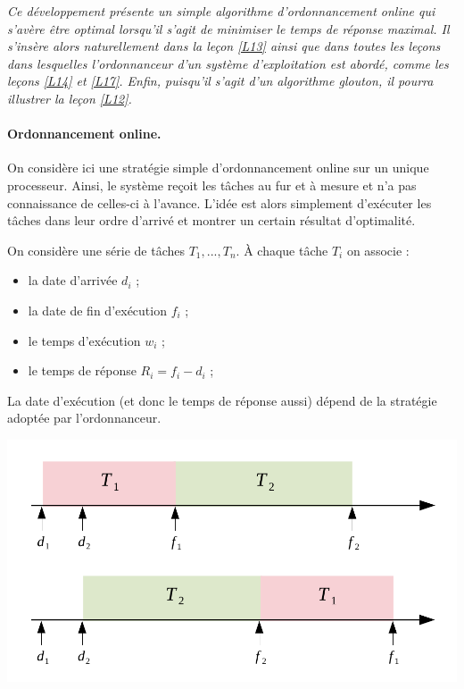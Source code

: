
\textit{Ce développement présente un simple algorithme d'ordonnancement online qui s'avère être optimal lorsqu'il s'agit de minimiser le temps de réponse maximal. Il s'insère alors naturellement dans la leçon \ref{L13} ainsi que dans toutes les leçons dans lesquelles l'ordonnanceur d'un système d'exploitation est abordé, comme les leçons \ref{L14} et \ref{L17}. Enfin, puisqu'il s'agit d'un algorithme glouton, il pourra illustrer la leçon \ref{L12}.}

\paragraph{Ordonnancement online.} On considère ici une stratégie simple d'ordonnancement online sur un unique processeur. Ainsi, le système reçoit les tâches au fur et à mesure et n'a pas connaissance de celles-ci à l'avance. L'idée est alors simplement d'exécuter les tâches dans leur ordre d'arrivé et montrer un certain résultat d'optimalité.\newline

On considère une série de tâches $T_1,...,T_n$. À chaque tâche $T_i$ on associe :
\begin{itemize}
\item la date d'arrivée $d_i$ ;
\item la date de fin d'exécution $f_i$ ;
\item le temps d'exécution $w_i$ ;
\item le temps de réponse $R_i = f_i-d_i$ ;
\end{itemize} 

\begin{rem}
La date d'exécution (et donc le temps de réponse aussi) dépend de la stratégie adoptée par l'ordonnanceur.
\end{rem}

\begin{center}
\includegraphics[scale=0.5]{Developpements/Ordonnancement online/ordo exemple.pdf}
\end{center}


